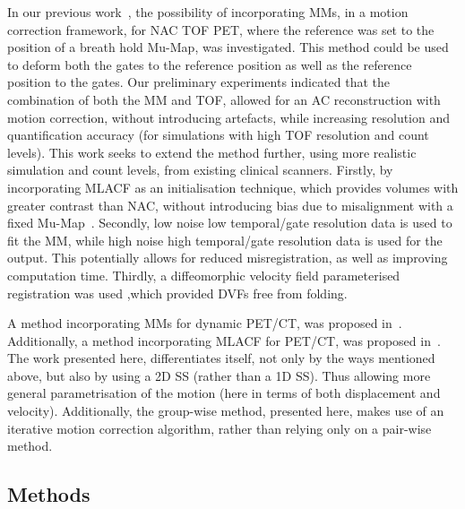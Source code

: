             In our previous work~\parencite{Whitehead2019ImpactPET, Whitehead2020PET/CTFields, Whitehead2021ComparisonMap}, the possibility of incorporating \glspl{MM}, in a motion correction framework, for \gls{NAC} \gls{TOF} \gls{PET}, where the reference was set to the position of a breath hold \gls{Mu-Map}, was investigated. This method could be used to deform both the gates to the reference position as well as the reference position to the gates. Our preliminary experiments indicated that the combination of both the \gls{MM} and \gls{TOF}, allowed for an \gls{AC} reconstruction with motion correction, without introducing artefacts, while increasing resolution and quantification accuracy (for simulations with high \gls{TOF} resolution and count levels). This work seeks to extend the method further, using more realistic simulation and count levels, from existing clinical scanners. Firstly, by incorporating \gls{MLACF} as an initialisation technique, which provides volumes with greater contrast than \gls{NAC}, without introducing bias due to misalignment with a fixed \gls{Mu-Map}~\parencite{Nuyts2012ML-reconstructionFactors}. Secondly, low noise low temporal/gate resolution data is used to fit the \gls{MM}, while high noise high temporal/gate resolution data is used for the output. This potentially allows for reduced misregistration, as well as improving computation time. Thirdly, a diffeomorphic velocity field parameterised registration was used ,which provided \glspl{DVF} free from folding.
            
            A method incorporating \glspl{MM} for dynamic \gls{PET}/\gls{CT}, was proposed in~\parencite{Chan2018Non-RigidPET}. Additionally, a method incorporating \gls{MLACF} for \gls{PET}/\gls{CT}, was proposed in~\parencite{Lu2018RespiratoryData}. The work presented here, differentiates itself, not only by the ways mentioned above, but also by using a \gls{2D} \gls{SS} (rather than a \gls{1D} \gls{SS}). Thus allowing more general parametrisation of the motion (here in terms of both displacement and velocity). Additionally, the group-wise method, presented here, makes use of an iterative motion correction algorithm, rather than relying only on a pair-wise method.
        
        \subsection{Methods} \label{sec:pet_ct_motion_correction_exploiting_motion_models_fit_on_coarsely_gated_data_applied_to_finely_gated_data_methods}
